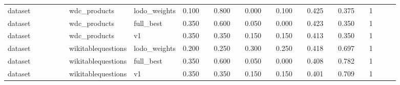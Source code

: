 \begin{landscape}
\begin{longtable}{p{0.162\linewidth}p{0.081\linewidth}p{0.081\linewidth}p{0.081\linewidth}p{0.081\linewidth}p{0.081\linewidth}p{0.081\linewidth}p{0.081\linewidth}p{0.081\linewidth}p{0.081\linewidth}}
dataset & wdc\_\allowbreak{}products & lodo\_\allowbreak{}weights & 0.100 & 0.800 & 0.000 & 0.100 & 0.425 & 0.375 & 1 \\
dataset & wdc\_\allowbreak{}products & full\_\allowbreak{}best & 0.350 & 0.600 & 0.050 & 0.000 & 0.423 & 0.350 & 1 \\
dataset & wdc\_\allowbreak{}products & v1 & 0.350 & 0.350 & 0.150 & 0.150 & 0.413 & 0.350 & 1 \\
dataset & wikitablequestions & lodo\_\allowbreak{}weights & 0.200 & 0.250 & 0.300 & 0.250 & 0.418 & 0.697 & 1 \\
dataset & wikitablequestions & full\_\allowbreak{}best & 0.350 & 0.600 & 0.050 & 0.000 & 0.408 & 0.782 & 1 \\
dataset & wikitablequestions & v1 & 0.350 & 0.350 & 0.150 & 0.150 & 0.401 & 0.709 & 1 \\
\bottomrule
\end{longtable}
\normalsize
\end{landscape}
